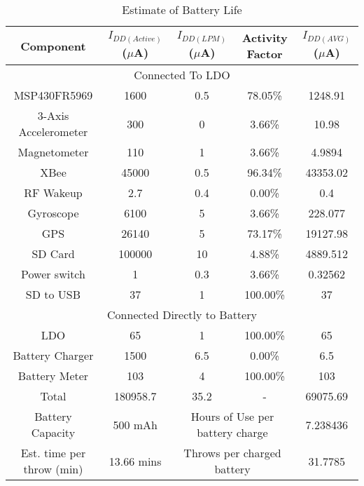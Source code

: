 \begin{table}[H]
  \centering
  \caption{Estimate of Battery Life}
    \begin{tabular}{|c|c|c|c|c|}
     \hline
     \rowcolor{Gray}
    Component & $I_{DD(Active)}$ ($\mu$A) & $I_{DD(LPM)}$ ($\mu$A) & Activity Factor & $I_{DD(AVG)}$ ($\mu$A) \\
     \hline \hline
    \multicolumn{5}{|c|}{\cellcolor{Gray}Connected To LDO} \\ \hline
    MSP430FR5969 & 1600  & 0.5   & 78.05\% & 1248.91 \\ \hline
    3-Axis Accelerometer & 300   & 0     & 3.66\% & 10.98 \\ \hline
    Magnetometer & 110   & 1     & 3.66\% & 4.9894 \\ \hline
    XBee  & 45000 & 0.5   & 96.34\% & 43353.02 \\ \hline
    RF Wakeup & 2.7   & 0.4   & 0.00\% & 0.4 \\ \hline
    Gyroscope & 6100  & 5     & 3.66\% & 228.077 \\ \hline
    GPS   & 26140 & 5     & 73.17\% & 19127.98 \\ \hline
    SD Card & 100000 & 10    & 4.88\% & 4889.512 \\ \hline
    Power switch & 1     & 0.3   & 3.66\% & 0.32562 \\ \hline
    SD to USB & 37    & 1     & 100.00\% & 37 \\ \hline
    \multicolumn{5}{|c|}{\cellcolor{Gray}Connected Directly to Battery} \\ \hline
    LDO   & 65    & 1     & 100.00\% & 65 \\ \hline
    Battery Charger & 1500  & 6.5   & 0.00\% & 6.5 \\ \hline
    Battery Meter & 103   & 4     & 100.00\% & 103 \\ \hline \hline
    Total & 180958.7 & 35.2  &    -   & 69075.69 \\ \hline \hline
    Battery Capacity &   500 mAh    &      \multicolumn{2}{c|}{Hours of Use per battery charge} & 7.238436 \\ \hline
    Est. time per throw (min) & 13.66 mins  &    \multicolumn{2}{c|}{Throws per charged battery} & 31.7785 \\ \hline
    
    \end{tabular}%
  \label{tab:batLife}%
\end{table}%


